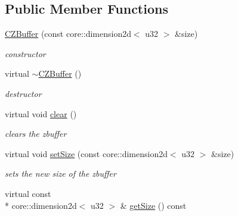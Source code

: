 \subsection*{Public Member Functions}
\begin{DoxyCompactItemize}
\item 
\hypertarget{classirr_1_1video_1_1_c_z_buffer_a7e5f33a859e2113c6522935efb6c2590}{\hyperlink{classirr_1_1video_1_1_c_z_buffer_a7e5f33a859e2113c6522935efb6c2590}{C\-Z\-Buffer} (const core\-::dimension2d$<$ u32 $>$ \&size)}\label{classirr_1_1video_1_1_c_z_buffer_a7e5f33a859e2113c6522935efb6c2590}

\begin{DoxyCompactList}\small\item\em constructor \end{DoxyCompactList}\item 
\hypertarget{classirr_1_1video_1_1_c_z_buffer_a073ac761a45ff4d1c3f48355737a1c8e}{virtual \hyperlink{classirr_1_1video_1_1_c_z_buffer_a073ac761a45ff4d1c3f48355737a1c8e}{$\sim$\-C\-Z\-Buffer} ()}\label{classirr_1_1video_1_1_c_z_buffer_a073ac761a45ff4d1c3f48355737a1c8e}

\begin{DoxyCompactList}\small\item\em destructor \end{DoxyCompactList}\item 
\hypertarget{classirr_1_1video_1_1_c_z_buffer_afc8df87b698af2a78367b3640168b009}{virtual void \hyperlink{classirr_1_1video_1_1_c_z_buffer_afc8df87b698af2a78367b3640168b009}{clear} ()}\label{classirr_1_1video_1_1_c_z_buffer_afc8df87b698af2a78367b3640168b009}

\begin{DoxyCompactList}\small\item\em clears the zbuffer \end{DoxyCompactList}\item 
\hypertarget{classirr_1_1video_1_1_c_z_buffer_afadce4f01d74a2e20ddd371bd5d3d4bb}{virtual void \hyperlink{classirr_1_1video_1_1_c_z_buffer_afadce4f01d74a2e20ddd371bd5d3d4bb}{set\-Size} (const core\-::dimension2d$<$ u32 $>$ \&size)}\label{classirr_1_1video_1_1_c_z_buffer_afadce4f01d74a2e20ddd371bd5d3d4bb}

\begin{DoxyCompactList}\small\item\em sets the new size of the zbuffer \end{DoxyCompactList}\item 
\hypertarget{classirr_1_1video_1_1_c_z_buffer_ad5e59dc6a411fface6ddd8bc85b0604c}{virtual const \\*
core\-::dimension2d$<$ u32 $>$ \& \hyperlink{classirr_1_1video_1_1_c_z_buffer_ad5e59dc6a411fface6ddd8bc85b0604c}{get\-Size} () const }\label{classirr_1_1video_1_1_c_z_buffer_ad5e59dc6a411fface6ddd8bc85b0604c}


\end{DoxyCompactItemize}
